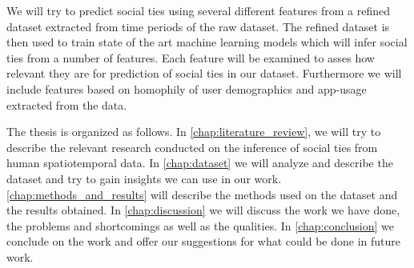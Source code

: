 We will try to predict social ties using several different features from a refined dataset extracted from time periods of the raw dataset. The refined dataset is then used to train state of the art machine learning models which will infer social ties from a number of features. Each feature will be examined to asses how relevant they are for prediction of social ties in our dataset. Furthermore we will include features based on homophily of user demographics and app-usage extracted from the data.

The thesis is organized as follows. In \autoref{chap:literature_review}, we will try to describe the relevant research conducted on the inference of social ties from human spatiotemporal data. In \autoref{chap:dataset} we will analyze and describe the dataset and try to gain insights we can use in our work. \autoref{chap:methods_and_results} will describe the methods used on the dataset and the results obtained. In \autoref{chap:discussion} we will discuss the work we have done, the problems and shortcomings as well as the qualities. In \autoref{chap:conclusion} we conclude on the work and offer our suggestions for what could be done in future work.


